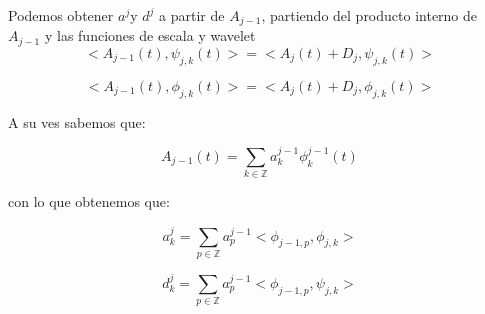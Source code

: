 \documentclass{beamer}
\begin{document}
  \begin{frame}
   Podemos obtener $a^{j}$y $d^{j}$ a partir de $A_{j-1}$, partiendo del producto interno de $A_{j-1}$ y las funciones de escala y wavelet
   \begin{equation}
<A_{j-1}(t),\psi _{j,k}(t)>=<A_{j}(t)+D_{j},\psi _{j,k}(t)>
\end{equation}

\begin{equation}
<A_{j-1}(t),\phi _{j,k}(t)>=<A_{j}(t)+D_{j},\phi _{j,k}(t)>
\end{equation}
  \end{frame}
  
  \begin{frame}
  A su ves sabemos que:
  
  \begin{equation}
  A_{j-1}(t)=\sum_{k \in \mathbb{Z}} a^{j-1}_{k} \phi^{j-1}_{k}(t)
  \end{equation}
  
  con lo que obtenemos que: 
  
  \begin{equation}
  a^{j}_{k}=\sum_{p \in \mathbb{Z}} a^{j-1}_{p} <\phi_{j-1,p},\phi_{j,k}>
  \end{equation}
  
  \begin{equation}
  d^{j}_{k}=\sum_{p \in \mathbb{Z}} a^{j-1}_{p} <\phi_{j-1,p},\psi_{j,k}>
  \end{equation}
  \end{frame}
  
\end{document}
